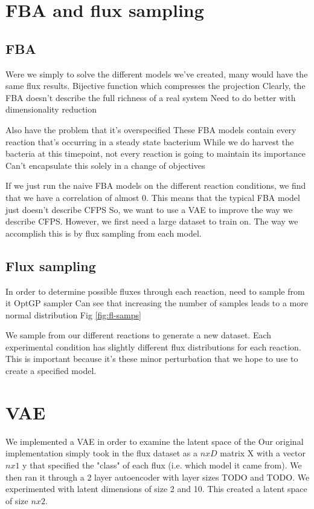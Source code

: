 \section{FBA and flux sampling}

\subsection{FBA}

Were we simply to solve the different models we've created, many would have the same flux results.
Bijective function which compresses the projection
Clearly, the FBA doesn't describe the full richness of a real system
Need to do better with dimensionality reduction

Also have the problem that it's overspecified
These FBA models contain every reaction that's occurring in a steady state bacterium
While we do harvest the bacteria at this timepoint, not every reaction is going to maintain its importance
Can't encapsulate this solely in a change of objectives

If we just run the naive FBA models on the different reaction conditions, we find that we have a correlation of almost 0.
This means that the typical FBA model just doesn't describe CFPS
So, we want to use a VAE to improve the way we describe CFPS.
However, we first need a large dataset to train on.
The way we accomplish this is by flux sampling from each model.

\subsection{Flux sampling}
In order to determine possible fluxes through each reaction, need to sample from it
OptGP sampler
Can see that increasing the number of samples leads to a more normal distribution
Fig \ref{fig:fl-samps}

We sample from our different reactions to generate a new dataset.
Each experimental condition has slightly different flux distributions for each reaction.
This is important because it's these minor perturbation that we hope to use to create a specified model.

\section{VAE}
We implemented a VAE in order to examine the latent space of the 
Our original implementation simply took in the flux dataset as a $n x D$ matrix X with a vector $n x 1$ y that specified the "class" of each flux (i.e. which model it came from).
We then ran it through a 2 layer autoencoder with layer sizes TODO and TODO.
We experimented with latent dimensions of size 2 and 10.
This created a latent space of size $n x 2$.

